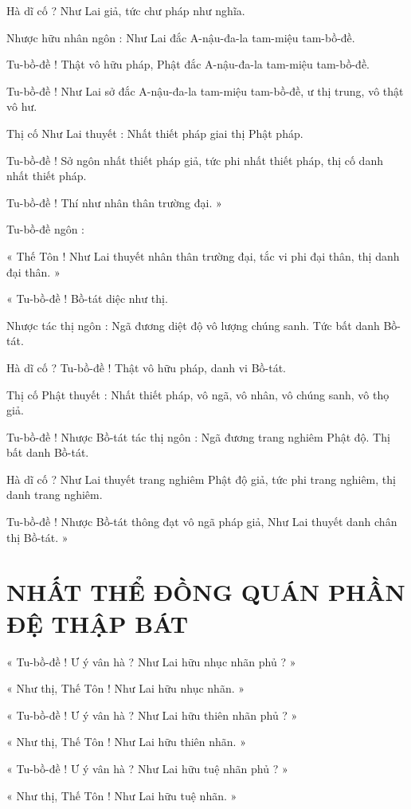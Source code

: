 	Hà dĩ cố ? Như Lai giả, tức chư pháp như nghĩa. 
	
	Nhược hữu nhân ngôn : Như Lai đắc A-nậu-đa-la tam-miệu tam-bồ-đề. 
	
	Tu-bồ-đề ! Thật vô hữu pháp, Phật đắc A-nậu-đa-la tam-miệu tam-bồ-đề. 
	
	Tu-bồ-đề ! Như Lai sở đắc A-nậu-đa-la tam-miệu tam-bồ-đề, ư thị trung, vô thật vô hư.
	
	Thị cố Như Lai thuyết : Nhất thiết pháp giai thị Phật pháp.
	
	Tu-bồ-đề ! Sở ngôn nhất thiết pháp giả, tức phi nhất thiết pháp, thị cố danh nhất thiết pháp. 
	
	Tu-bồ-đề ! Thí như nhân thân trường đại. »
	
	Tu-bồ-đề ngôn : 
	
	« Thế Tôn ! Như Lai thuyết nhân thân trường đại, tắc vi phi đại thân, thị danh đại thân. »
	
	« Tu-bồ-đề ! Bồ-tát diệc như thị. 
	
	Nhược tác thị ngôn : Ngã đương diệt độ vô lượng chúng sanh. Tức bất danh Bồ-tát.
	
	Hà dĩ cố ? Tu-bồ-đề ! Thật vô hữu pháp, danh vi Bồ-tát. 
	
	Thị cố Phật thuyết : Nhất thiết pháp, vô ngã, vô nhân, vô chúng sanh, vô thọ giả. 
	
	Tu-bồ-đề ! Nhược Bồ-tát tác thị ngôn : Ngã đương trang nghiêm Phật độ. Thị bất danh Bồ-tát. 
	
	Hà dĩ cố ? Như Lai thuyết trang nghiêm Phật độ giả, tức phi trang nghiêm, thị danh trang nghiêm. 
	
	Tu-bồ-đề ! Nhược Bồ-tát thông đạt vô ngã pháp giả, Như Lai thuyết danh chân thị Bồ-tát. »
	
	\section*{NHẤT THỂ ĐỒNG QUÁN PHẦN ĐỆ THẬP BÁT}
	
	« Tu-bồ-đề ! Ư ý vân hà ? Như Lai hữu nhục nhãn phủ ? »
	
	« Như thị, Thế Tôn ! Như Lai hữu nhục nhãn. »
	
	« Tu-bồ-đề ! Ư ý vân hà ? Như Lai hữu thiên nhãn phủ ? » 
	
	« Như thị, Thế Tôn ! Như Lai hữu thiên nhãn. »
	
	« Tu-bồ-đề ! Ư ý vân hà ? Như Lai hữu tuệ nhãn phủ ? »
	
	« Như thị, Thế Tôn ! Như Lai hữu tuệ nhãn. »
	

